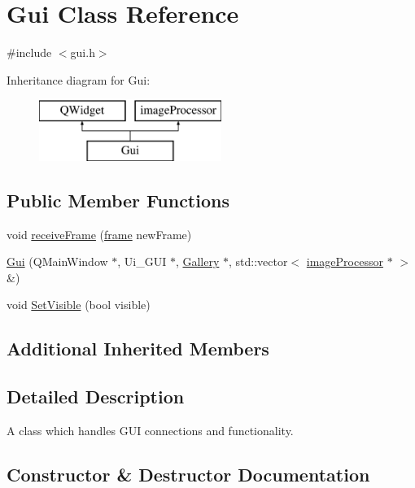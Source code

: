 \hypertarget{class_gui}{}\section{Gui Class Reference}
\label{class_gui}


{\ttfamily \#include $<$gui.\+h$>$}

Inheritance diagram for Gui\+:\begin{figure}[H]
\begin{center}
\leavevmode
\includegraphics[height=2.000000cm]{class_gui}
\end{center}
\end{figure}
\subsection*{Public Member Functions}
\begin{DoxyCompactItemize}
\item 
void \hyperlink{class_gui_a2f058a424b6584d1907b1f45422da4f6}{receive\+Frame} (\hyperlink{classframe}{frame} new\+Frame)
\item 
\hyperlink{class_gui_a0787d4633eeebebc31ec40ad2b441c25}{Gui} (Q\+Main\+Window $\ast$, Ui\+\_\+\+G\+UI $\ast$, \hyperlink{class_gallery}{Gallery} $\ast$, std\+::vector$<$ \hyperlink{classimage_processor}{image\+Processor} $\ast$ $>$ \&)
\item 
void \hyperlink{class_gui_ac76a8210e18720a6bd248c0f1425a738}{Set\+Visible} (bool visible)
\end{DoxyCompactItemize}
\subsection*{Additional Inherited Members}


\subsection{Detailed Description}
A class which handles G\+UI connections and functionality. 

\subsection{Constructor \& Destructor Documentation}
